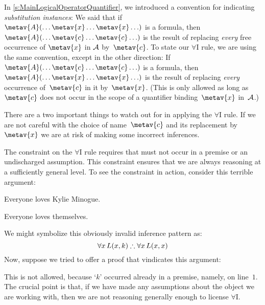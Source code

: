 In \cref{s:MainLogicalOperatorQuantifier}, we introduced a convention
for indicating \emph{substitution instances}: We said that if
$\metav{A}(\ldots \metav{x} \ldots \metav{x}\ldots)$ is a formula,
then $\metav{A}(\ldots \metav{c} \ldots \metav{c}\ldots)$ is the
result of replacing \emph{every} free occurrence of $\metav{x}$ in
$\mathcal{A}$ by~$\metav{c}$. To state our $\forall$I rule, we are using
the same convention, except in the other direction: If
$\metav{A}(\ldots \metav{c} \ldots \metav{c}\ldots)$ is a formula,
then $\metav{A}(\ldots \metav{x} \ldots \metav{x}\ldots)$ is the
result of replacing \emph{every} occurrence of~$\metav{c}$ in it
by~$\metav{x}$. (This is only allowed as long as $\metav{c}$ does not
occur in the scope of a quantifier binding~$\metav{x}$ in~$\mathcal{A}$.)

There are a two important things to watch out for in applying the
$\forall$I rule. If we are not careful with the choice of
name~$\metav{c}$ and its replacement by~$\metav{x}$ we are at risk of
making some incorrect inferences.

The constraint on the $\forall$I rule requires that  must not
occur in a premise or an undischarged assumption. This constraint
ensures that we are always reasoning at a sufficiently general level.
To see the constraint in action, consider this terrible argument:
	\begin{earg}
		\item Everyone loves Kylie Minogue.
		\item[\texttherefore] Everyone loves themselves.
	\end{earg}
We might symbolize this obviously invalid inference pattern as:
$$\forall x\,\atom{L}{x,k} \therefore \forall x\,\atom{L}{x,x}$$
Now, suppose we tried to offer a proof that vindicates this argument:
\begin{fitchproof}
	\PR
	 
	 
\end{fitchproof}
This is not allowed, because `$k$' occurred already in a premise, namely, on line~$1$. The crucial point is that, if we have made any assumptions about the object we are working with, then we are not reasoning generally enough to license $\forall$I.

